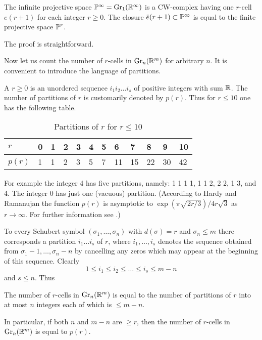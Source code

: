 \documentclass[../main]{subfiles}
\begin{document}
\begin{corollary}
\label{cor:06.05}
The infinite projective space $\mathbb{P}^{\infty}=\operatorname{Gr}_{1}(\mathbb R^\infty)$ is a CW-complex having one $r$-cell $e(r+1)$ for each integer $r \geq 0$. The closure $\xoverline{e}(r+1) \subset \projective^{\infty}$ is equal to the finite projective space $\mathbb{P}^{r}$.
\end{corollary}
The proof is straightforward.

Now let us count the number of $r$-cells in $\operatorname{Gr}_{n}(\mathbb R^m)$ for arbitrary $n$. It is convenient to introduce the language of partitions. 
\pagebreak
\begin{definition}
\label{def:06.06}
A  $r \geq 0$ is an unordered sequence $i_{1} i_{2} \dots i_{s}$ of positive integers with sum $\mathbb R$. The number of partitions of $r$ is customarily denoted by $p(r) $. Thus for $r \leq 10$ one has the following table.

\begin{table}[!h]
\centering
\begin{tabular}{|l|lllllllllll|}
	\hline
	$r$ & 0 & 1 & 2 & 3 & 4 & 5 & 6 & 7 & 8 & 9 & 10 \\
	\hline
	$p(r)$ & 1 & 1 & 2 & 3 & 5 & 7 & 11 & 15 & 22 & 30 & 42 \\
	\hline
\end{tabular}
\caption{Partitions of $r$ for $r\leq 10$}
\end{table}
\end{definition}
For example the integer 4 has five partitions, namely: 1 1 1 1, 1 1 2, 2 2, 1 3, and 4. The integer 0 has just one (vacuous) partition. (According to Hardy and Ramanujan the function $p(r)$ is asymptotic to $\exp (\pi \sqrt{2 r / 3}) / 4 r \sqrt{3}$ as $r\rightarrow \infty$. For further information see \cite{ostmann1956}.)

To every Schubert symbol $(\sigma_{1},\dots, \sigma_{n})$ with $d(\sigma)=r$ and $\sigma_{n} \leq m$ there corresponds a partition $i_{1}\dots i_{s}$ of $r$, where $i_{1},\dots, i_{s}$ denotes the sequence obtained from $\sigma_{1}-1,\dots, \sigma_{n}-n$ by cancelling any zeros which may appear at the beginning of this sequence. Clearly
\[
1 \leq i_{1} \leq i_{2} \leq\dots \leq i_{s} \leq m-n
\]
and $s \leq n $. Thus
\begin{corollary}
\label{cor:06.07}
The number of $r$-cells in $\operatorname{Gr}_{n}(\mathbb R^m)$ is equal to the number of partitions of $r$ into at most $n$ integers each of which is $\leq m-n$.
\end{corollary}
In particular, if both $n$ and $m-n$ are $\geq r$, then the number of $r$-cells in $\operatorname{Gr}_{n}(\mathbb R^m)$ is equal to $p(r)$.
\end{document}
